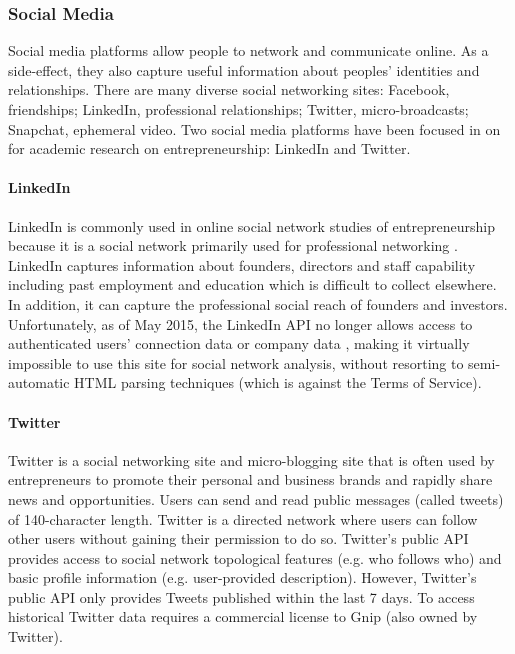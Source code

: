 \documentclass[../thesis/thesis.tex]{subfiles}
\begin{document}
\subsubsection{Social Media}

Social media platforms allow people to network and communicate online. As a side-effect, they also capture useful information about peoples' identities and relationships. There are many diverse social networking sites: Facebook, friendships; LinkedIn, professional relationships; Twitter, micro-broadcasts; Snapchat, ephemeral video. Two social media platforms have been focused in on for academic research on entrepreneurship: LinkedIn and Twitter.

\paragraph{LinkedIn}

LinkedIn is commonly used in online social network studies of entrepreneurship because it is a social network primarily used for professional networking \cite{formsma2012, song2012}. LinkedIn captures information about founders, directors and staff capability including past employment and education which is difficult to collect elsewhere. In addition, it can capture the professional social reach of founders and investors. Unfortunately, as of May 2015, the LinkedIn API no longer allows access to authenticated users' connection data or company data \cite{trachtenberg2015}, making it virtually impossible to use this site for social network analysis, without resorting to semi-automatic HTML parsing techniques (which is against the Terms of Service).

\paragraph{Twitter}

Twitter is a social networking site and micro-blogging site that is often used by entrepreneurs to promote their personal and business brands and rapidly share news and opportunities. Users can send and read public messages (called tweets) of 140-character length. Twitter is a directed network where users can follow other users without gaining their permission to do so. Twitter's public API provides access to social network topological features (e.g. who follows who) and basic profile information (e.g. user-provided description). However, Twitter's public API only provides Tweets published within the last 7 days. To access historical Twitter data requires a commercial license to Gnip (also owned by Twitter).
\end{document}
